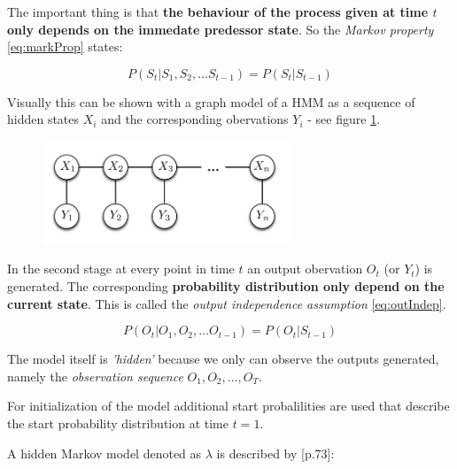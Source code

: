 The important thing is that \textbf{the behaviour of the process given at time $t$ only depends on the immedate predessor state}. So the \emph{Markov property} \eqref{eq:markProp} states:

\begin{equation}
	P(S_t | S_1,S_2, \ldots S_{t-1}) = P(S_t | S_{t-1})
	\label{eq:markProp}
\end{equation}

Visually this can be shown with a graph model of a HMM as a sequence of hidden states $X_i$ and the corresponding obervations $Y_i$ - see figure \ref{fig:GraphModel}.

\begin{figure}[H]
	\centering
	
	\includegraphics[width=0.66\textwidth]{./Images/GraphModelHMM_1.png}
	\caption{ \cite{hmm_II}}
	\label{fig:GraphModel}
\end{figure}

In the second stage at every point in time $t$ an output obervation $O_t$ (or $Y_t$) is generated. The corresponding \textbf{probability distribution only depend on the current state}. This is called the \emph{output independence assumption} \eqref{eq:outIndep}.

\begin{equation}
P(O_t | O_1,O_2, \ldots O_{t-1}) = P(O_t | S_{t-1})
\label{eq:outIndep}
\end{equation} 

The model itself is \emph{'hidden'} because we only can observe the outputs generated, namely the \emph{observation sequence} $O_1, O_2, \ldots,  O_T$.

For initialization of the model additional start probalilities are used that describe the start probability distribution at time $t=1$.

A hidden Markov model denoted as $\lambda$ is described by \cite{mm_pr}[p.73]:


